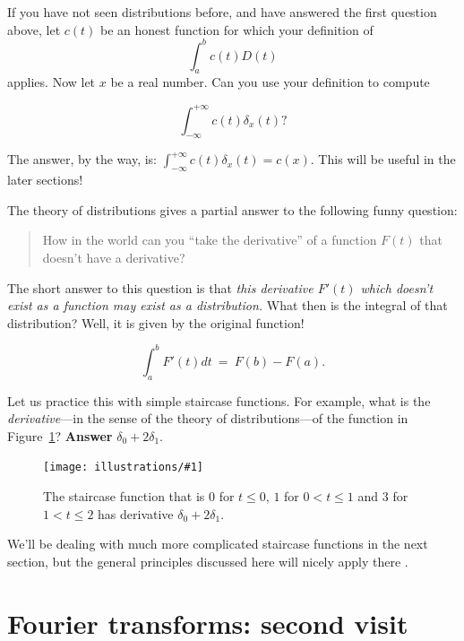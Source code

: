 \documentclass[openany]{book}
\newcommand{\ill}[3]{%
   \begin{figure}[H]%
   \vspace{-2ex}
   \centering%
   \texttt{[image: illustrations/\#1]}%
   \caption{#3}%
   \vspace{-2ex}
    \end{figure}}
\theoremstyle{plain}
\theoremstyle{definition}
\begin{document}
{ If you have not seen distributions
before, and have answered the first question above, let
$c(t)$ be an honest function for which your definition
of $$\int_a^bc(t)D(t)$$ applies. Now let $x$ be a real number.
 Can you use your definition to compute

 $$\int_{-{\infty}}^{+{\infty}}c(t)\delta_x(t)?$$

 The answer, by the way, is:
 $\int_{-{\infty}}^{+{\infty}}c(t)\delta_x(t)=c(x).$ This will be useful in the later sections!


The theory of distributions gives a partial answer to the following funny question:


\begin{quote} How in the world can you ``take the derivative'' of a
  function $F(t)$ that doesn't have a derivative?
\end{quote}

The short answer to this question is that {\it this derivative $F'(t)$
  which doesn't exist as a function may exist as a distribution.}
What then is the integral of that distribution? Well, it is given by
the original function!

$$\int_a^bF'(t)dt \ = \ F(b) -F(a).$$

Let us practice this with simple staircase functions. For example,
what is the {\it derivative}---in the sense of the theory of
distributions---of the function in Figure~\ref{fig:simple_staircase}?
{\bf Answer} $\delta_0 + 2 \delta_1$.


\ill{simple_staircase}{.6}{The staircase function that is $0$ for $t
  \le 0$, $1$ for $0 <t \le 1$ and $3$ for $1< t \le 2$ has derivative
  $\delta_0 + 2\delta_1$.\label{fig:simple_staircase}}


We'll be dealing with much more complicated staircase functions in the
next section, but the general principles discussed here will nicely
apply there .


\chapter{Fourier transforms: second visit}

}
\end{document}
